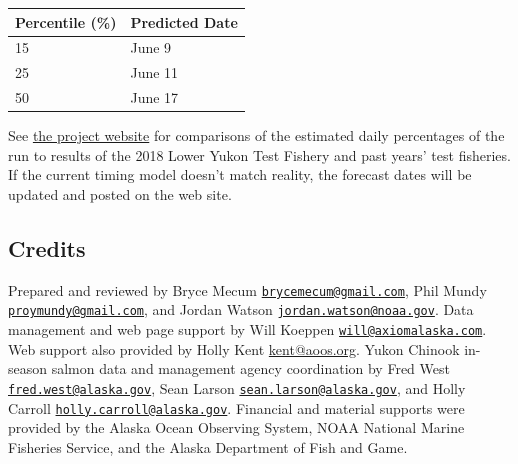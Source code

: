 \documentclass[]{article}
\begin{document}
\begin{longtable}[]{@{}ll@{}}
\toprule
Percentile (\%) & Predicted Date\tabularnewline
\midrule
\endhead
15 & June 9\tabularnewline
25 & June 11\tabularnewline
50 & June 17\tabularnewline
\bottomrule
\end{longtable}

See
\href{http://www.aoos.org/2018-run-timing-outlook-and-forecast-summary-chinook-salmon-yukon-river-delta/}{the
project website} for comparisons of the estimated daily percentages of
the run to results of the 2018 Lower Yukon Test Fishery and past years'
test fisheries. If the current timing model doesn't match reality, the
forecast dates will be updated and posted on the web site.

\hypertarget{credits}{%
\subsection{Credits}\label{credits}}

Prepared and reviewed by Bryce Mecum
\href{mailto:brycemecum@gmail.com}{\nolinkurl{brycemecum@gmail.com}},
Phil Mundy
\href{mailto:proymundy@gmail.com}{\nolinkurl{proymundy@gmail.com}}, and
Jordan Watson
\href{mailto:jordan.watson@noaa.gov}{\nolinkurl{jordan.watson@noaa.gov}}.
Data management and web page support by Will Koeppen
\href{mailto:will@axiomalaska.com}{\nolinkurl{will@axiomalaska.com}}.
Web support also provided by Holly Kent
\href{mailto:\%20kent@aoos.org}{kent@aoos.org}. Yukon Chinook in-season
salmon data and management agency coordination by Fred West
\href{mailto:fred.west@alaska.gov}{\nolinkurl{fred.west@alaska.gov}},
Sean Larson
\href{mailto:sean.larson@alaska.gov}{\nolinkurl{sean.larson@alaska.gov}},
and Holly Carroll
\href{mailto:holly.carroll@alaska.gov}{\nolinkurl{holly.carroll@alaska.gov}}.
Financial and material supports were provided by the Alaska Ocean
Observing System, NOAA National Marine Fisheries Service, and the Alaska
Department of Fish and Game.
\end{document}
